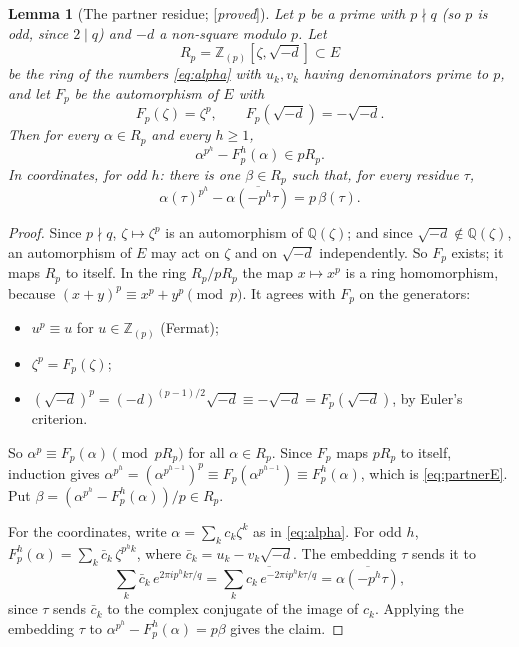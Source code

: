 \documentclass[11pt]{amsart}
\numberwithin{equation}{section}
\newtheorem{lemma}[theorem]{Lemma}
\theoremstyle{definition}
\theoremstyle{remark}
\newcommand{\Z}{\mathbb Z}
\newcommand{\Q}{\mathbb Q}
\newcommand{\status}[1]{\textup{[\emph{#1}]}}
\begin{document}
\begin{lemma}[The partner residue; \status{proved}]\label{lem:partner}
Let $p$ be a prime with $p\nmid q$ (so $p$ is odd, since $2\mid q$) and $-d$ a non-square modulo $p$. Let
\begin{equation}\label{eq:Rp}
 R_p=\Z_{(p)}[\zeta,\sqrt{-d}]\subset E
\end{equation}
be the ring of the numbers \eqref{eq:alpha} with $u_k,v_k$ having denominators prime to $p$, and let $F_p$ be the automorphism of $E$ with
\begin{equation}\label{eq:Fp}
 F_p(\zeta)=\zeta^p,\qquad F_p(\sqrt{-d})=-\sqrt{-d}.
\end{equation}
Then for every $\alpha\in R_p$ and every $h\ge1$,
\begin{equation}\label{eq:partnerE}
 \alpha^{p^h}-F_p^h(\alpha)\in pR_p .
\end{equation}
In coordinates, for odd $h$: there is one $\beta\in R_p$ such that, for every residue $\tau$,
\begin{equation}
 \alpha(\tau)^{p^h}-\overline{\alpha(-p^h\tau)}=p\,\beta(\tau).
\end{equation}
\end{lemma}

\begin{proof}
Since $p\nmid q$, $\zeta\mapsto\zeta^p$ is an automorphism of $\Q(\zeta)$; and since $\sqrt{-d}\notin\Q(\zeta)$, an automorphism of $E$ may act on $\zeta$ and on $\sqrt{-d}$ independently. So $F_p$ exists; it maps $R_p$ to itself. In the ring $R_p/pR_p$ the map $x\mapsto x^p$ is a ring homomorphism, because $(x+y)^p\equiv x^p+y^p\pmod p$. It agrees with $F_p$ on the generators:
\begin{itemize}[leftmargin=2em]
\item $u^p\equiv u$ for $u\in\Z_{(p)}$ (Fermat);
\item $\zeta^p=F_p(\zeta)$;
\item $(\sqrt{-d})^p=(-d)^{(p-1)/2}\sqrt{-d}\equiv-\sqrt{-d}=F_p(\sqrt{-d})$, by Euler's criterion.
\end{itemize}
So $\alpha^p\equiv F_p(\alpha)\pmod{pR_p}$ for all $\alpha\in R_p$. Since $F_p$ maps $pR_p$ to itself, induction gives $\alpha^{p^h}=(\alpha^{p^{h-1}})^p\equiv F_p(\alpha^{p^{h-1}})\equiv F_p^h(\alpha)$, which is \eqref{eq:partnerE}. Put $\beta=(\alpha^{p^h}-F_p^h(\alpha))/p\in R_p$.

For the coordinates, write $\alpha=\sum_kc_k\zeta^k$ as in \eqref{eq:alpha}. For odd $h$, $F_p^h(\alpha)=\sum_k\bar c_k\,\zeta^{p^hk}$, where $\bar c_k=u_k-v_k\sqrt{-d}$. The embedding $\tau$ sends it to
\begin{equation}
 \sum_k\bar c_k\,e^{2\pi ip^hk\tau/q}=\overline{\sum_kc_k\,e^{-2\pi ip^hk\tau/q}}=\overline{\alpha(-p^h\tau)},
\end{equation}
since $\tau$ sends $\bar c_k$ to the complex conjugate of the image of $c_k$. Applying the embedding $\tau$ to $\alpha^{p^h}-F_p^h(\alpha)=p\beta$ gives the claim.
\end{proof}
\end{document}
